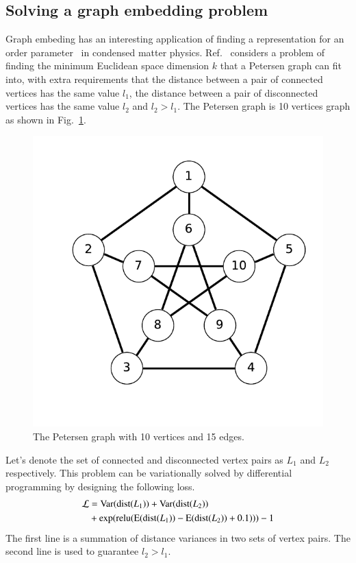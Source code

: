 \documentclass[aps,twocolumn,longbibliography,english,superscriptaddress]{revtex4-1}
\newcommand{\<}{\langle}
\renewcommand{\>}{\rangle}
\newcommand{\Var}{{\mathrm{Var}}}
\newcommand{\Mean}{{\mathrm{E}}}
\newcommand{\Fig}[1]{Fig.~\ref{#1}}
\newcommand{\Ref}[1]{Ref.~\onlinecite{#1}}
\theoremstyle{definition}\newtheorem{definition}{\textit{Definition}}
\begin{document}
\subsection{Solving a graph embedding problem}\label{sec:graph}
Graph embeding has an interesting application of finding a representation for an order parameter~\cite{Takahashi2020} in condensed matter physics.
\Ref{Takahashi2020} considers a problem of finding the minimum Euclidean space dimension $k$ that a Petersen graph can fit into, with extra requirements that the distance between a pair of connected vertices has the same value $l_1$, the distance between a pair of disconnected vertices has the same value $l_2$ and $l_2 > l_1$.
The Petersen graph is 10 vertices graph as shown in \Fig{fig:petersen}.
\begin{figure}
    \centerline{\includegraphics[width=0.6\columnwidth,trim={0 1cm 0 0},clip]{images/petersen.pdf}}
    \caption{The Petersen graph with 10 vertices and 15 edges.}\label{fig:petersen}
\end{figure}
Let's denote the set of connected and disconnected vertex pairs as $L_1$ and $L_2$ respectively. This problem can be variationally solved by differential programming by designing the following loss.
\begin{align}
    \begin{split}
        \mathcal{L} &= \Var({\rm dist}(L_1)) + \Var({\rm dist}(L_2)) \\
        &+\exp({\rm relu}(\Mean({\rm dist}(L_1)) - \Mean({\rm dist}(L_2)) + 0.1))) - 1
    \end{split}
\end{align}
The first line is a summation of distance variances in two sets of vertex pairs. The second line is used to guarantee $l_2 > l_1$.
\end{document}
